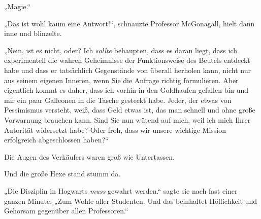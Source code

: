 „Magie.“

„Das ist wohl kaum eine Antwort!“, schnauzte Professor McGonagall, hielt dann inne und blinzelte.

„Nein, ist es nicht, oder? Ich \emph{sollte} behaupten, dass es daran liegt, dass ich experimentell die wahren Geheimnisse der Funktionsweise des Beutels entdeckt habe und dass er tatsächlich Gegenstände von überall herholen kann, nicht nur aus seinem eigenen Inneren, wenn Sie die Anfrage richtig formulieren. Aber eigentlich kommt es daher, dass ich vorhin in den Goldhaufen gefallen bin und mir ein paar Galleonen in die Tasche gesteckt habe.
Jeder, der etwas von Pessimismus versteht, weiß, dass Geld etwas ist, das man schnell und ohne große Vorwarnung brauchen kann. Sind Sie nun wütend auf mich, weil ich mich Ihrer Autorität widersetzt habe? Oder froh, dass wir unsere wichtige Mission erfolgreich abgeschlossen haben?“

Die Augen des Verkäufers waren groß wie Untertassen.

Und die große Hexe stand stumm da.

„Die Disziplin in Hogwarts \emph{muss} gewahrt werden.“ sagte sie nach fast einer ganzen Minute. „Zum Wohle aller Studenten. Und das beinhaltet Höflichkeit und Gehorsam gegenüber allen Professoren.“

